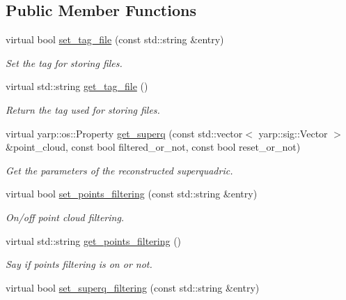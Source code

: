\subsection*{Public Member Functions}
\begin{DoxyCompactItemize}
\item 
virtual bool \mbox{\hyperlink{classsuperquadricModel__IDL_a781426bfc4862e87ef75a4bbbfa33275}{set\+\_\+tag\+\_\+file}} (const std\+::string \&entry)
\begin{DoxyCompactList}\small\item\em Set the tag for storing files. \end{DoxyCompactList}\item 
virtual std\+::string \mbox{\hyperlink{classsuperquadricModel__IDL_a6d39eaa247aec65fe2bfefbdace4ec85}{get\+\_\+tag\+\_\+file}} ()
\begin{DoxyCompactList}\small\item\em Return the tag used for storing files. \end{DoxyCompactList}\item 
virtual yarp\+::os\+::\+Property \mbox{\hyperlink{classsuperquadricModel__IDL_a10039bb93445066d9dd29d8f6c9ef6c5}{get\+\_\+superq}} (const std\+::vector$<$ yarp\+::sig\+::\+Vector $>$ \&point\+\_\+cloud, const bool filtered\+\_\+or\+\_\+not, const bool reset\+\_\+or\+\_\+not)
\begin{DoxyCompactList}\small\item\em Get the parameters of the reconstructed superquadric. \end{DoxyCompactList}\item 
virtual bool \mbox{\hyperlink{classsuperquadricModel__IDL_a1a2080d797a81b46b0dffa86b5367e15}{set\+\_\+points\+\_\+filtering}} (const std\+::string \&entry)
\begin{DoxyCompactList}\small\item\em On/off point cloud filtering. \end{DoxyCompactList}\item 
virtual std\+::string \mbox{\hyperlink{classsuperquadricModel__IDL_aa490ebcf39414aaaae41d5095267abb9}{get\+\_\+points\+\_\+filtering}} ()
\begin{DoxyCompactList}\small\item\em Say if points filtering is on or not. \end{DoxyCompactList}\item 
virtual bool \mbox{\hyperlink{classsuperquadricModel__IDL_af418edf09afd9374c5272d018c58e8a7}{set\+\_\+superq\+\_\+filtering}} (const std\+::string \&entry)

\end{DoxyCompactItemize}
